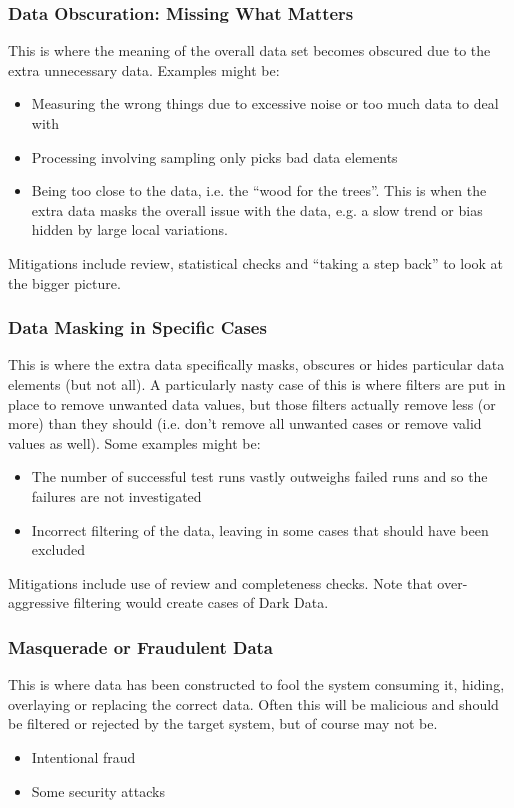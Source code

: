 \subsubsection{Data Obscuration: Missing What Matters}
This is where the meaning of the overall data set becomes obscured due to the extra unnecessary data. Examples might be:
\begin{itemize}
    \item Measuring the wrong things due to excessive noise or too much data to deal with
    \item Processing involving sampling only picks bad data elements
    \item Being too close to the data, i.e. the ``wood for the trees''. This is when the extra data masks the overall issue with the data, e.g. a slow trend or bias hidden by large local variations.
\end{itemize}

Mitigations include review, statistical checks and ``taking a step back'' to look at the bigger picture.
\subsubsection{Data Masking in Specific Cases}
This is where the extra data specifically masks, obscures or hides particular data elements (but not all). A particularly nasty case of this is where filters are put in place to remove unwanted data values, but those filters actually remove less (or more) than they should (i.e. don’t remove all unwanted cases or remove valid values as well). Some examples might be:
\begin{itemize}
    \item The number of successful test runs vastly outweighs failed runs and so the failures are not investigated
    \item Incorrect filtering of the data, leaving in some cases that should have been excluded
\end{itemize}

Mitigations include use of review and completeness checks. Note that over-aggressive filtering would create cases of Dark Data.
\subsubsection{Masquerade or Fraudulent Data}
This is where data has been constructed to fool the system consuming it, hiding, overlaying or replacing the correct data. Often this will be malicious and should be filtered or rejected by the target system, but of course may not be. 
\begin{itemize}
    \item Intentional fraud
    \item Some security attacks
\end{itemize}

